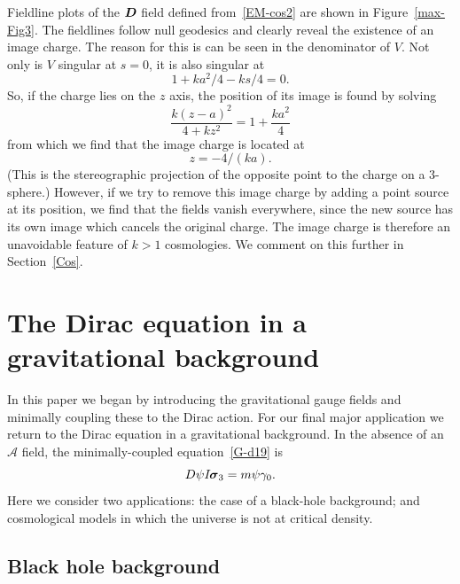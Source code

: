 \documentclass[a4paper]{article}
\numberwithin{equation}{section}
\newcommand{\sig}{\mbox{\boldmath $\sigma$}}
\newcommand{\bD}{\mbox{\boldmath $D$}}
\newcommand{\bsig}{\mbox{\boldmath $\sig$}}
\newcommand{\cla}{{\mathcal{A}}}
\newcommand{\isk}{I \hspace{-1pt} \bsig_3}
\newcommand{\go}{\gamma_{0}}
\begin{document}
Fieldline plots of the $\bD$ field defined from~\eqref{EM-cos2} are shown
in Figure~\ref{max-Fig3}.  The fieldlines follow null geodesics and
clearly reveal the existence of an image charge.  The reason for this
is can be seen in the denominator of $V$.  Not only is $V$ singular at
$s=0$, it is also singular at
%
\begin{equation}
1+ ka^2/4 - ks/4 = 0.
\end{equation}
%
So, if the charge lies on the $z$ axis, the position of its
image is found by solving
%
\begin{equation}
\frac{k(z-a)^2}{4+kz^2} = 1 +  \frac{ka^2}{4}
\end{equation}
%
from which we find that the image charge is located at
%
\begin{equation}
z = -4/(ka).
\end{equation}
%
(This is the stereographic projection of the opposite point to the
charge on a 3-sphere.)  However, if we try to remove this image charge
by adding a point source at its position, we find that the fields
vanish everywhere, since the new source has its own image which cancels
the original charge.  The image charge is therefore an unavoidable
feature of $k>1$ cosmologies.  We comment on this further in
Section~\ref{Cos}.




\section{The Dirac equation in a gravitational background} 
\label{DE} 

In this paper we began by introducing the gravitational gauge fields
and minimally coupling these to the Dirac action.  For our final major
application we return to the Dirac equation in a gravitational
background.  In the absence of an $\cla$ field, the minimally-coupled
equation~\eqref{G-d19} is
%
\begin{equation}
D \psi \isk = m \psi \go .
\label{D-eq}
\end{equation}
%
Here we consider two applications: the case of a black-hole
background; and cosmological models in which the universe is not at
critical density.


\subsection{Black hole background}
\end{document}
